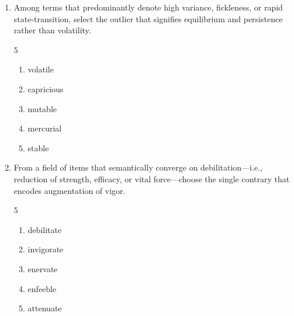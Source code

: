 \documentclass[12pt]{article}
\begin{document}
\begin{enumerate}[label=\textbf{\arabic*.}]
\begin{multicols}{5}
\begin{enumerate}[label=(\Alph*)]
\item censure

\item laud

\item praise

\end{enumerate}

\end{multicols}

\item Among terms that predominantly denote high variance, fickleness, or rapid state-transition, select the outlier that signifies equilibrium and persistence rather than volatility.

\begin{multicols}{5}

\begin{enumerate}[label=(\Alph*)]

\item volatile

\item capricious

\item mutable

\item mercurial

\item stable

\end{enumerate}

\end{multicols}

\item From a field of items that semantically converge on debilitation—i.e., reduction of strength, efficacy, or vital force—choose the single contrary that encodes augmentation of vigor.

\begin{multicols}{5}

\begin{enumerate}[label=(\Alph*)]

\item debilitate

\item invigorate

\item enervate

\item enfeeble

\item attenuate


\end{enumerate}
\end{multicols}
\end{enumerate}
\end{document}
